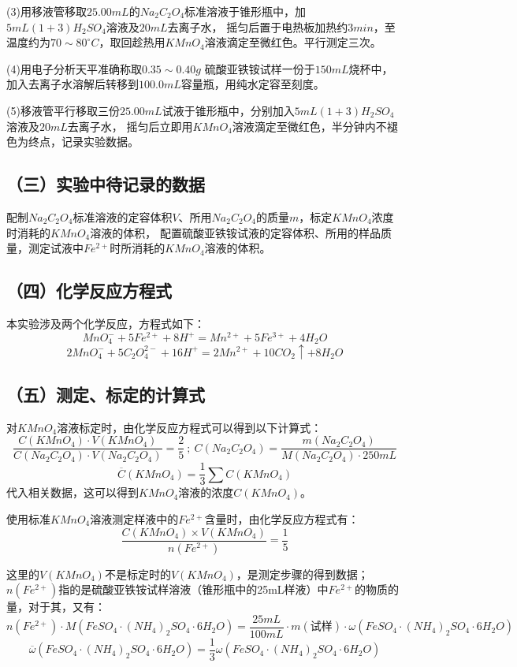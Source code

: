 \documentclass[a4paper,12pt]{article}
\begin{document}
(3)用移液管移取$ 25.00 mL$的$ Na_2C_2O_4$标准溶液于锥形瓶中，加$ 5 mL(1+3)H_2SO_4$溶液及$ 20 mL$去离子水，
摇匀后置于电热板加热约$ 3 min$，至温度约为$ 70\sim 80^{\circ}C$，取回趁热用$ KMnO_4$溶液滴定至微红色。平行测定三次。

(4)用电子分析天平准确称取$ 0.35\sim 0.40 g$ 硫酸亚铁铵试样一份于$ 150 mL $烧杯中，加入去离子水溶解后转移到$ 100.0 mL$容量瓶，用纯水定容至刻度。

(5)移液管平行移取三份$ 25.00 mL$试液于锥形瓶中，分别加入$ 5mL(1+3)H_2SO_4$溶液及$ 20 mL$去离子水，
摇匀后立即用$ KMnO_4$溶液滴定至微红色，半分钟内不褪色为终点，记录实验数据。

\subsection*{（三）实验中待记录的数据}
配制$ Na_2C_2O_4$标准溶液的定容体积$V$、所用$ Na_2C_2O_4$的质量$m$，标定$ KMnO_4$浓度时消耗的$ KMnO_4$溶液的体积，
配置硫酸亚铁铵试液的定容体积、所用的样品质量，测定试液中$ Fe^{2+}$时所消耗的$ KMnO_4$溶液的体积。

\subsection*{（四）化学反应方程式}
本实验涉及两个化学反应，方程式如下：
$$
MnO_4^-+5Fe^{2+}+8H^+=Mn^{2+}+5Fe^{3+}+4H_2O
$$$$
2MnO_4^-+5C_2O_4^{2-}+16H^+=2Mn^{2+}+10CO_2\uparrow+8H_2O
$$

\subsection*{（五）测定、标定的计算式}

对$ KMnO_4$溶液标定时，由化学反应方程式可以得到以下计算式：
$$
\frac{C(KMnO_4)\cdot V(KMnO_4)}{C(Na_2C_2O_4)\cdot V(Na_2C_2O_4)}=\frac{2}{5}
\ ;\
C(Na_2C_2O_4) = \frac{m(Na_2C_2O_4)}{M(Na_2C_2O_4)\cdot 250mL}
$$$$
\overline{C}(KMnO_4)=\frac{1}{3}\sum C(KMnO_4)
$$
代入相关数据，这可以得到$ KMnO_4$溶液的浓度$ C(KMnO_4)$。

使用标准$ KMnO_4$溶液测定样液中的$ Fe^{2+}$含量时，由化学反应方程式有：
$$
\frac{C(KMnO_4)\times V(KMnO_4)}{n(Fe^{2+})}=\frac{1}{5}
$$

这里的$ V(KMnO_4)$不是标定时的$ V(KMnO_4)$，是测定步骤的得到数据；
$n(Fe^{2+})$指的是硫酸亚铁铵试样溶液（锥形瓶中的25mL样液）中$ Fe^{2+}$的物质的量，对于其，又有：
$$
n(Fe^{2+})\cdot M(FeSO_4\cdot (NH_4)_2SO_4\cdot 6H_2O)=\frac{25mL}{100mL} \cdot m(\text{试样})\cdot \omega(FeSO_4\cdot (NH_4)_2SO_4\cdot 6H_2O)
$$$$
\overline{\omega}(FeSO_4\cdot (NH_4)_2SO_4\cdot 6H_2O)=\frac{1}{3}\omega(FeSO_4\cdot (NH_4)_2SO_4\cdot 6H_2O)
$$
\end{document}
